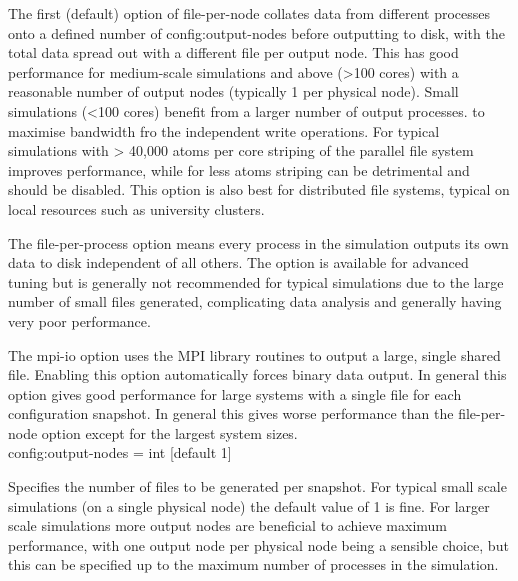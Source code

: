 The first (default) option of file-per-node collates data from
different processes onto a defined number of config:output-nodes before
outputting to disk, with the total data spread out with a different file per
output node. This has good performance for medium-scale simulations and above
(>100 cores) with a reasonable number of output nodes (typically 1 per physical
node). Small simulations (<100 cores) benefit from a larger number of output
processes. to maximise bandwidth fro the independent write operations. For
typical simulations with > 40,000 atoms per core striping of the parallel file
system improves performance, while for less atoms striping can be detrimental
and should be disabled. This option is also best for distributed file systems,
typical on local resources such as university clusters.

The file-per-process option means every process in the simulation outputs its
own data to disk independent of all others. The option is available for advanced
tuning but is generally not recommended for typical simulations due to the large
number of small files generated, complicating data analysis and generally having
very poor performance.

The mpi-io option uses the MPI library routines to output a large, single shared
file. Enabling this option automatically forces binary data output. In general
this option gives good performance for large systems with a single file for each
configuration snapshot. In general this gives worse performance than the
file-per-node option except for the largest system sizes.\\

{\zicf config:output-nodes = int [default 1]}
Specifies the number of files to be generated per snapshot. For typical small
scale simulations (on a single physical node) the default value of 1 is fine.
For larger scale simulations more output nodes are beneficial to achieve maximum
performance, with one output node per physical node being a sensible choice, but
this can be specified up to the maximum number of processes in the simulation.\\



